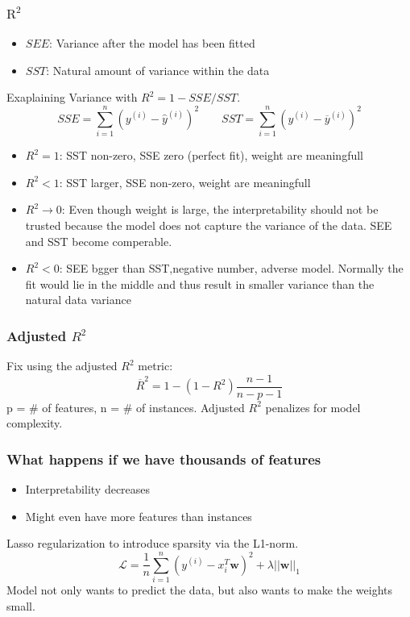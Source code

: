 \subsubsection{\(\text{R}^2\)}
\begin{itemize}
    \item \(SEE\): Variance after the model has been fitted
    \item \(SST\): Natural amount of variance within the data
\end{itemize}
Exaplaining Variance with \(R^2 = 1 - SSE /SST\).
\[
SSE = \sum_{i = 1}^{n}\left(y^{(i)}-\hat{y}^{(i)}\right)^2 \qquad SST = \sum_{i = 1}^{n}\left(y^{(i)}-\overline{y}^{(i)}\right)^2
\]
\begin{itemize}
    \item \(R^2 = 1\): SST non-zero, SSE zero (perfect fit), weight are meaningfull
    \item \(R^2 < 1\): SST larger, SSE non-zero, weight are meaningfull
    \item \(R^2 \rightarrow 0\): Even though weight is large, the interpretability should not be trusted because the model does not capture the variance of the data. SEE and SST become comperable.
    \item \(R^2 < 0\): SEE bgger than SST,negative number, adverse model. Normally the fit would lie in the middle and thus result in smaller variance than the natural data variance
\end{itemize}
\subsubsection{Adjusted \(R^2\)}
Fix using the adjusted \(R^2\) metric:
\[
\overline{R}^2  = 1-(1-R^2)\frac{n-1}{n-p-1}
\]
p = \# of features, n = \# of instances.
Adjusted \(R^2\) penalizes for model complexity.

\subsubsection*{What happens if we have thousands of features}
\begin{itemize}
    \item Interpretability decreases
    \item Might even have more features than instances
\end{itemize}
Lasso regularization to introduce sparsity via the L1-norm.
\[
\mathcal{L} = \frac{1}{n}\sum_{i =1}^{n }\left(y^{(i)} - x_i^T\mathbf{w}\right)^2 + \lambda ||\mathbf{w}||_1
\]
Model not only wants to predict the data, but also wants to make the weights small.

